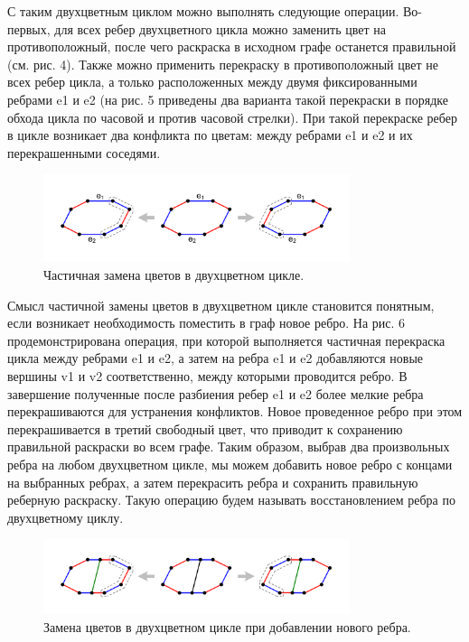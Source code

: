 С таким двухцветным циклом можно выполнять следующие операции.
Во-первых, для всех ребер двухцветного цикла можно заменить цвет на противоположный, после чего раскраска в исходном графе останется правильной (см. рис. 4).
Также можно применить перекраску в противоположный цвет не всех ребер цикла, а только расположенных между двумя фиксированными ребрами e1 и e2 (на рис. 5 приведены два варианта такой перекраски в порядке обхода цикла по часовой и против часовой стрелки).
При такой перекраске ребер в цикле возникает два конфликта по цветам: между ребрами e1 и e2 и их перекрашенными соседями.

\begin{figure}[ht]
	\centering
		\includegraphics[width=0.8\textwidth]{./pics/text_3_edge_coloring/5-bicolor-cycle-partial-switch.pdf}
	\caption{Частичная замена цветов в двухцветном цикле.}
	\label{fig:text_3_edge_coloring_5}
\end{figure}

Смысл частичной замены цветов в двухцветном цикле становится понятным, если возникает необходимость поместить в граф новое ребро.
На рис. 6 продемонстрирована операция, при которой выполняется частичная перекраска цикла между ребрами e1 и e2, а затем на ребра e1 и e2 добавляются новые вершины v1 и v2 соответственно, между которыми проводится ребро.
В завершение полученные после разбиения ребер e1 и e2 более мелкие ребра перекрашиваются для устранения конфликтов.
Новое проведенное ребро при этом перекрашивается в третий свободный цвет, что приводит к сохранению правильной раскраски во всем графе.
Таким образом, выбрав два произвольных ребра на любом двухцветном цикле, мы можем добавить новое ребро с концами на выбранных ребрах, а затем перекрасить ребра и сохранить правильную реберную раскраску.
Такую операцию будем называть восстановлением ребра по двухцветному циклу.

\begin{figure}[ht]
	\centering
		\includegraphics[width=0.8\textwidth]{./pics/text_3_edge_coloring/6-bicolor-cycle-new-edge.pdf}
	\caption{Замена цветов в двухцветном цикле при добавлении нового ребра.}
	\label{fig:text_3_edge_coloring_6}
\end{figure}

